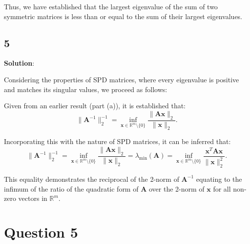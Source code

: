 \documentclass{article}
\begin{document}
Thus, we have established that the largest eigenvalue of the sum of two symmetric matrices is less than or equal to the sum of their largest eigenvalues.
\subsection{5}
\textbf{Solution}:

Considering the properties of SPD matrices, where every eigenvalue is positive and matches its singular values, we proceed as follows:

Given from an earlier result (part (a)), it is established that:
$$
\|\boldsymbol{A}^{-1}\|_2^{-1} = \inf_{\boldsymbol{x} \in \mathbb{R}^m \setminus \{0\}} \frac{\|\boldsymbol{A} \boldsymbol{x}\|_2}{\|\boldsymbol{x}\|_2}.
$$

Incorporating this with the nature of SPD matrices, it can be inferred that:
$$
\|\boldsymbol{A}^{-1}\|_2^{-1} = \inf_{\boldsymbol{x} \in \mathbb{R}^m \setminus \{0\}} \frac{\|\boldsymbol{A} \boldsymbol{x}\|_2}{\|\boldsymbol{x}\|_2} = \lambda_{\min}(\boldsymbol{A}) = \inf_{\boldsymbol{x} \in \mathbb{R}^m \setminus \{0\}} \frac{\boldsymbol{x}^T \boldsymbol{A} \boldsymbol{x}}{\|\boldsymbol{x}\|_2^2}.
$$

This equality demonstrates the reciprocal of the 2-norm of $\boldsymbol{A}^{-1}$ equating to the infimum of the ratio of the quadratic form of $\boldsymbol{A}$ over the 2-norm of $\boldsymbol{x}$ for all non-zero vectors in $\mathbb{R}^m$.
\section{Question 5}
\end{document}

